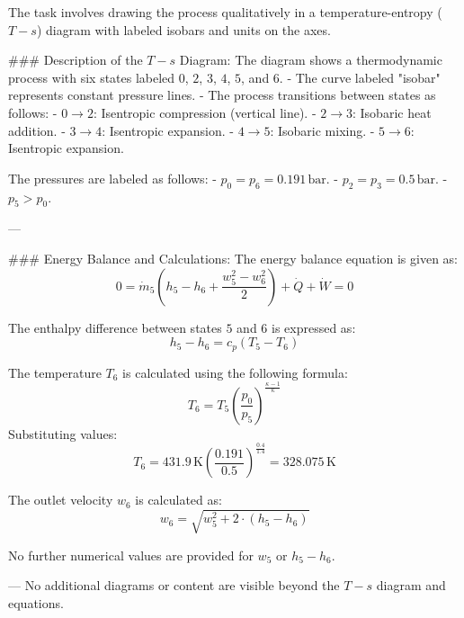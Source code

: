 The task involves drawing the process qualitatively in a temperature-entropy (\(T-s\)) diagram with labeled isobars and units on the axes.  

### Description of the \(T-s\) Diagram:  
The diagram shows a thermodynamic process with six states labeled \(0\), \(2\), \(3\), \(4\), \(5\), and \(6\).  
- The curve labeled "isobar" represents constant pressure lines.  
- The process transitions between states as follows:  
  - \(0 \to 2\): Isentropic compression (vertical line).  
  - \(2 \to 3\): Isobaric heat addition.  
  - \(3 \to 4\): Isentropic expansion.  
  - \(4 \to 5\): Isobaric mixing.  
  - \(5 \to 6\): Isentropic expansion.  

The pressures are labeled as follows:  
- \(p_0 = p_6 = 0.191 \, \text{bar}\).  
- \(p_2 = p_3 = 0.5 \, \text{bar}\).  
- \(p_5 > p_0\).  

---

### Energy Balance and Calculations:  
The energy balance equation is given as:  
\[
0 = \dot{m}_5 \left( h_5 - h_6 + \frac{w_5^2 - w_6^2}{2} \right) + \dot{Q} + \dot{W} = 0
\]  

The enthalpy difference between states \(5\) and \(6\) is expressed as:  
\[
h_5 - h_6 = c_p (T_5 - T_6)
\]  

The temperature \(T_6\) is calculated using the following formula:  
\[
T_6 = T_5 \left( \frac{p_0}{p_5} \right)^{\frac{\kappa - 1}{\kappa}}
\]  
Substituting values:  
\[
T_6 = 431.9 \, \text{K} \left( \frac{0.191}{0.5} \right)^{\frac{0.4}{1.4}} = 328.075 \, \text{K}
\]  

The outlet velocity \(w_6\) is calculated as:  
\[
w_6 = \sqrt{w_5^2 + 2 \cdot (h_5 - h_6)}
\]  

No further numerical values are provided for \(w_5\) or \(h_5 - h_6\).  

---  
No additional diagrams or content are visible beyond the \(T-s\) diagram and equations.